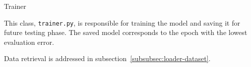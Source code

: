 \begin{section}{Trainer}
    \par This class, \texttt{trainer.py}, is responsible for training the model and saving it for future testing phase. The saved model corresponds to the epoch with the lowest evaluation error.
    \par Data retrieval is addressed in subsection~\ref{subsubsec:loader-dataset}.
    
\end{section}
\clearpage